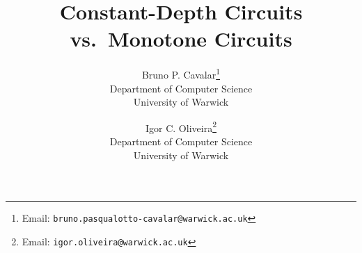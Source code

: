 \documentclass[11pt]{article}
\begin{document}
\title{Constant-Depth Circuits vs.~Monotone Circuits\vspace{0.5cm}}

\author{
		Bruno P. Cavalar\footnote{Email: \texttt{bruno.pasqualotto-cavalar@warwick.ac.uk}}\vspace{0.2cm}\\{\small Department of Computer Science}\\{\small University of Warwick\vspace{0.3cm}}
		\and	
		Igor C. Oliveira\footnote{Email: \texttt{igor.oliveira@warwick.ac.uk}}\vspace{0.2cm}\\{\small Department of Computer Science}\\
		{\small University of Warwick} 
	}

\maketitle

\vspace{-0.6cm}
\end{document}
